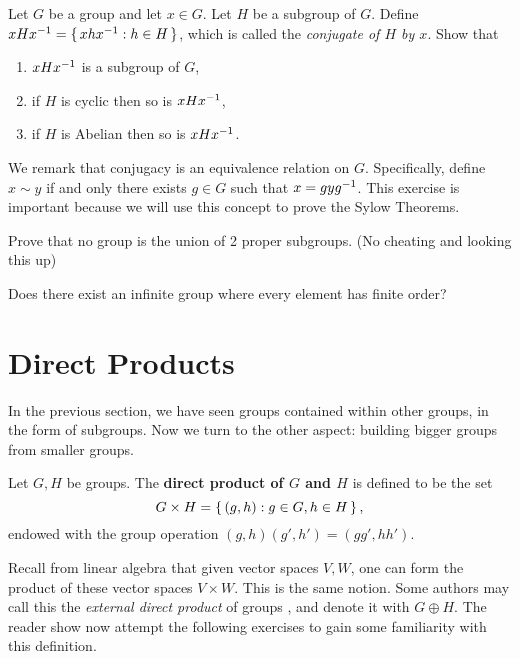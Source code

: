 \documentclass[./main.tex]{subfiles}
\begin{document}
\begin{exercise}[Conjugates]
    Let $G$ be a group and let $x \in G$. Let $H$ be a subgroup of $G$. 
    Define $xHx^{-1} = \set{xhx^{-1}: h \in H}$, which is called the \emph{conjugate of $H$ by $x$}.
    Show that 
    \begin{enumerate}
        \item $xHx^{-1}$ is a subgroup of $G$,
        \item if $H$ is cyclic then so is $xHx^{-1}$,
        \item if $H$ is Abelian then so is $xHx^{-1}$.
    \end{enumerate}
    
    We remark that conjugacy is an equivalence relation on $G$. Specifically,
    define $x \sim y$ if and only there exists $g \in G$ such that $x =
    gyg^{-1}$. This exercise is important because we will use this concept to
    prove the Sylow Theorems.
\end{exercise}


\begin{prob}
    Prove that no group is the union of 2 proper subgroups. (No cheating and
    looking this up)
\end{prob}

\begin{prob}
    Does there exist an infinite group where every element has finite order?
\end{prob}

\section{Direct Products}

In the previous section, we have seen groups contained within other groups, in
the form of subgroups. Now we turn to the other aspect: building bigger groups
from smaller groups. 

\begin{definition}
\label{def:direct-product}
    Let $G, H$ be groups. The \textbf{direct product of $G$ and $H$} is defined to be 
    the set 
    \[
        G \times H = \set{(g,h) : g \in G, h \in H},
    \]
    endowed with the group operation $(g,h)(g',h') = (gg', hh')$.
\end{definition}
Recall from linear algebra that given vector spaces $V, W$, one can form the
product of these vector spaces $V \times W$. This is the same notion. Some
authors may call this the \emph{external direct product} of groups
\autocite[Ch~8]{Gallian_2020}, and denote it with $G \oplus H$. The reader show
now attempt the following exercises to gain some familiarity with this
definition.
\end{document}
